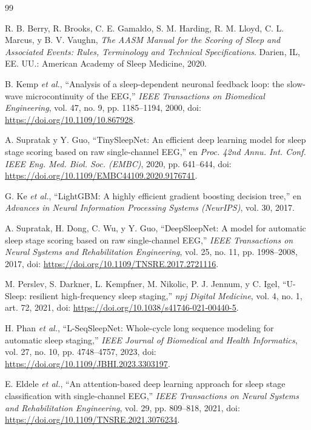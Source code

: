 \documentclass[conference]{IEEEtran}
\begin{document}
\renewcommand{\refname}{Referencias}
\begin{thebibliography}{99}

R. B. Berry, R. Brooks, C. E. Gamaldo, S. M. Harding, R. M. Lloyd, C. L. Marcus, y B. V. Vaughn, \textit{The AASM Manual for the Scoring of Sleep and Associated Events: Rules, Terminology and Technical Specifications}. Darien, IL, EE. UU.: American Academy of Sleep Medicine, 2020.

B. Kemp \textit{et al.}, ``Analysis of a sleep-dependent neuronal feedback loop: the slow-wave microcontinuity of the EEG,'' \textit{IEEE Transactions on Biomedical Engineering}, vol. 47, no. 9, pp. 1185--1194, 2000, doi: \url{https://doi.org/10.1109/10.867928}.

A. Supratak y Y. Guo, ``TinySleepNet: An efficient deep learning model for sleep stage scoring based on raw single-channel EEG,'' en \textit{Proc. 42nd Annu. Int. Conf. IEEE Eng. Med. Biol. Soc. (EMBC)}, 2020, pp. 641--644, doi: \url{https://doi.org/10.1109/EMBC44109.2020.9176741}.

G. Ke \textit{et al.}, ``LightGBM: A highly efficient gradient boosting decision tree,'' en \textit{Advances in Neural Information Processing Systems (NeurIPS)}, vol. 30, 2017.

A. Supratak, H. Dong, C. Wu, y Y. Guo, ``DeepSleepNet: A model for automatic sleep stage scoring based on raw single-channel EEG,'' \textit{IEEE Transactions on Neural Systems and Rehabilitation Engineering}, vol. 25, no. 11, pp. 1998--2008, 2017, doi: \url{https://doi.org/10.1109/TNSRE.2017.2721116}.

M. Perslev, S. Darkner, L. Kempfner, M. Nikolic, P. J. Jennum, y C. Igel, ``U-Sleep: resilient high-frequency sleep staging,'' \textit{npj Digital Medicine}, vol. 4, no. 1, art. 72, 2021, doi: \url{https://doi.org/10.1038/s41746-021-00440-5}.

H. Phan \textit{et al.}, ``L-SeqSleepNet: Whole-cycle long sequence modeling for automatic sleep staging,'' \textit{IEEE Journal of Biomedical and Health Informatics}, vol. 27, no. 10, pp. 4748--4757, 2023, doi: \url{https://doi.org/10.1109/JBHI.2023.3303197}.

E. Eldele \textit{et al.}, ``An attention-based deep learning approach for sleep stage classification with single-channel EEG,'' \textit{IEEE Transactions on Neural Systems and Rehabilitation Engineering}, vol. 29, pp. 809--818, 2021, doi: \url{https://doi.org/10.1109/TNSRE.2021.3076234}.


\end{thebibliography}
\end{document}
